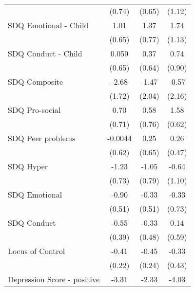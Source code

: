 {\begin{tabular}{l*{3}{c}}
            &      (0.74)         &      (0.65)         &      (1.12)         \\
\addlinespace
SDQ Emotional - Child&        1.01         &        1.37         &        1.74         \\
            &      (0.65)         &      (0.77)         &      (1.13)         \\
\addlinespace
SDQ Conduct - Child&       0.059         &        0.37         &        0.74         \\
            &      (0.65)         &      (0.64)         &      (0.90)         \\
\addlinespace
SDQ Composite&       -2.68         &       -1.47         &       -0.57         \\
            &      (1.72)         &      (2.04)         &      (2.16)         \\
\addlinespace
SDQ Pro-social&        0.70         &        0.58         &        1.58\sym{*}  \\
            &      (0.71)         &      (0.76)         &      (0.62)         \\
\addlinespace
SDQ Peer problems&     -0.0044         &        0.25         &        0.26         \\
            &      (0.62)         &      (0.65)         &      (0.47)         \\
\addlinespace
SDQ Hyper   &       -1.23         &       -1.05         &       -0.64         \\
            &      (0.73)         &      (0.79)         &      (1.10)         \\
\addlinespace
SDQ Emotional&       -0.90         &       -0.33         &       -0.33         \\
            &      (0.51)         &      (0.51)         &      (0.73)         \\
\addlinespace
SDQ Conduct &       -0.55         &       -0.33         &        0.14         \\
            &      (0.39)         &      (0.48)         &      (0.59)         \\
\addlinespace
Locus of Control&       -0.41         &       -0.45         &       -0.33         \\
            &      (0.22)         &      (0.24)         &      (0.43)         \\
\addlinespace
Depression Score - positive&       -3.31\sym{*}  &       -2.33\sym{*}  &       -4.03         \\

\end{tabular}}

